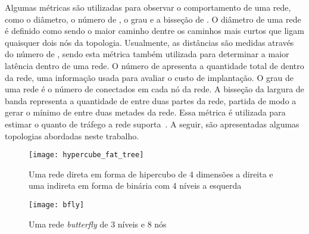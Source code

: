Algumas métricas são utilizadas para observar o comportamento de uma rede, como o diâmetro, o número de \links, o grau e a bisseção de \links. 
O diâmetro de uma rede é definido como sendo o maior caminho dentre os caminhos mais curtos que ligam quaisquer dois nós da topologia. Usualmente, as distâncias são medidas através do número de \hops, sendo esta métrica também utilizada para determinar a maior latência dentro de uma rede. 
O número de \links apresenta a quantidade total de \links dentro da rede, uma informação usada para avaliar o custo de implantação. 
O grau de uma rede é o número de \links conectados em cada nó da rede. 
A bisseção da largura de banda representa a quantidade de \links entre duas partes da rede, partida de modo a gerar o mínimo de \links entre duas metades da rede. 
Essa métrica é utilizada para estimar o quanto de tráfego a rede suporta~\cite{david:paralel}. A seguir, são apresentadas algumas topologias abordadas neste trabalho.

\begin{figure} [t]
    \texttt{[image: hypercube\_fat\_tree]}
    \centering
    \caption[Um hipercubo de e uma \fatt]{Uma rede direta em forma de hipercubo de 4 dimensões a direita e uma indireta em forma de \fatt binária com 4 níveis a esquerda~\cite{bhatele-encyclopedia}}
    \label{fig:cube_fat}
\end{figure}

\begin{figure} [t]
    \texttt{[image: bfly]}
    \centering
    \caption[Uma rede \textit{Buttefly}]{Uma rede \textit{butterfly} de 3 níveis e 8 nós~\cite{Liu:bfly}}
    \label{fig:bfly}
\end{figure}


